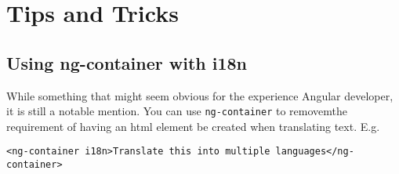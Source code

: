 \section{Tips and Tricks}
\subsection{Using ng-container with i18n}
While something that might seem obvious for the experience Angular developer, it is still a notable mention. You can use \lstinline{ng-container} to removemthe requirement of having an html element be created when translating text. E.g.
\begin{lstlisting}
<ng-container i18n>Translate this into multiple languages</ng-container>
\end{lstlisting}

